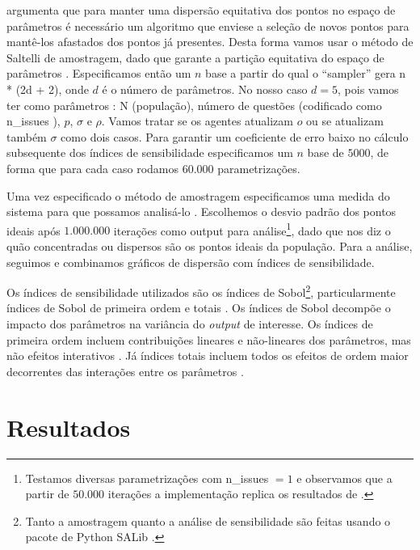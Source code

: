  argumenta que para manter uma dispersão equitativa
dos pontos no espaço de parâmetros é necessário um algoritmo que enviese a
seleção de novos pontos para mantê-los afastados dos pontos já presentes. Desta
forma vamos usar o método de Saltelli de amostragem, dado que garante a partição
equitativa do espaço de parâmetros \cite{herman2017salib}. Especificamos então
um \(n\) base a partir do qual o ``sampler'' gera n * (2d + 2), onde \(d\) é o
número de parâmetros. No nosso caso \(d = 5\), pois vamos ter como parâmetros :
N (população), número de questões (codificado como n\_issues ), \(p\), \(\sigma\) e
\(\rho\). Vamos tratar se os agentes atualizam \(o\) ou se atualizam também \(\sigma\)
como dois casos. Para garantir um coeficiente de erro baixo no cálculo
subsequente dos índices de sensibilidade especificamos um \(n\) base de
\(5000\), de forma que para cada caso rodamos \(60.000\) parametrizações.

Uma vez especificado o método de amostragem especificamos uma medida do sistema
para que possamos analisá-lo \cite{railsback2012agent}. Escolhemos o desvio
padrão dos pontos ideais após \(1.000.000\) iterações como output para
análise\footnote{Testamos diversas parametrizações com n\_issues \(= 1\) e
  observamos que a partir de \(50.000\) iterações a implementação replica os
  resultados de .}, dado que nos diz o quão
concentradas ou dispersos são os pontos ideais da população. Para a análise,
seguimos \cite{ten2016sensitivity} e combinamos gráficos de dispersão com
índices de sensibilidade. 

Os índices de sensibilidade utilizados são os índices de Sobol\footnote{Tanto a
  amostragem quanto a análise de sensibilidade são feitas usando o pacote de
  Python SALib \cite{herman2017salib}.}, particularmente índices de Sobol de
primeira ordem e totais \cite{saltelli2008global}. Os índices de Sobol decompõe
o impacto dos parâmetros na variância do \textit{output} de interesse. Os
índices de primeira ordem incluem contribuições lineares e não-lineares dos
parâmetros, mas não efeitos interativos \cite{ten2016sensitivity}. Já índices
totais incluem todos os efeitos de ordem maior decorrentes das interações entre
os parâmetros \cite{saltelli2008global}.



\section{Resultados}

